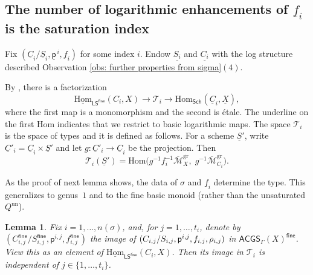 \documentclass{article}
\def\oM{\overline{\mathcal{M}}}
\newtheorem{lemma}[definition]{Lemma}
\newcommand{\gr}{\mathrm{gr}}
\begin{document}
\subsection{The number of logarithmic enhancements of $\underline{f}_i$ is the saturation index}


Fix $(\underline{C}_i/\underline{S}_i, \underline{\mathsf{p}}^{\,i}, \underline{f}_i)$ for some index $i$. Endow $\underline{S_{i}}$ and $\underline{C_i}$ with the log structure described Observation \ref{obs: further properties from sigma}$(4)$. 


By \cite[Theorem~1.1]{Wise}, there is a factorization 
\begin{equation}\label{eqn: Wise factorization}
\underline{\mathrm{Hom}}_{\mathsf{LS}^{\mathsf{fine}}}(C_i, X)
\longrightarrow \mathcal{T}_i
\longrightarrow \mathrm{Hom}_{\mathsf{Sch}}(\underline{C}_i, \underline{X}),
\end{equation}
where the first map is a monomorphism and the second is étale. The underline on the first $\mathrm{Hom}$ indicates that we restrict to basic logarithmic maps. The space $\mathcal{T}_i$ is the space of types and it is defined as follows. For a scheme $\underline{S}'$, write $\underline{C}'_i = \underline{C}_i \times \underline{S}'$ and let $g \colon \underline{C}'_i \to \underline{C}_i$ be the projection. Then
\[
\mathcal{T}_i(\underline{S}') 
= \mathrm{Hom}\bigl(g^{-1} f_i^{-1} \oM_X^{\mathrm{\gr}},\; g^{-1} \oM_{C_i}^{\mathrm{\gr}}\bigr).
\]


As the proof of next lemma shows, the data of $\sigma$ and $\underline{f}_i$ determine the type. This generalizes \cite[Proposition~3.6.3]{R17} to genus~$1$ and to the fine basic monoid (rather than the unsaturated $Q^{\mathrm{un}}$).

\begin{lemma}\label{lemma: uniqueness of fine maps} 
Fix $i = 1, \ldots, n(\sigma)$, and, for $j=1,\ldots, t_i$, denote by $(C_{i,j}^{\mathsf{fine}}/S_{i,j}^{\mathsf{fine}}, \mathsf{p}^{i,j}, f_{i,j}^{\mathsf{fine}})$ the image of $(C_{i,j}/S_{i,j}, \mathsf{p}^{i,j},\\ f_{i,j}, \rho_{i,j})$ in $\mathsf{ACGS}_{\Gamma}(X)^{\mathsf{fine}}$. View this as an element of $\underline{\mathrm{Hom}}_{\mathsf{LS}^{\mathsf{fine}}}(C_i, X)$. Then its image in $\mathcal{T}_i$ is independent of $j \in \{1, \ldots, t_i\}$.
\end{lemma}
\end{document}
